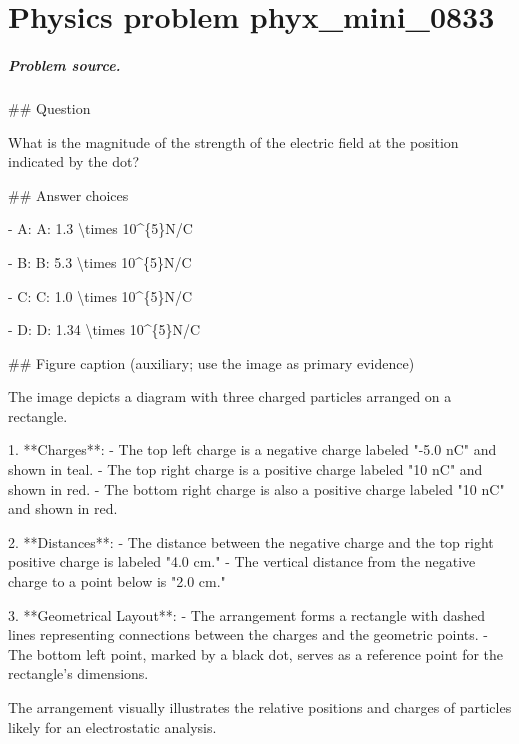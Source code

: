 
\chapter{Physics problem phyx\_mini\_0833}
\label{ch:PhyXMiniProblems_problem_phyx_mini_0833}

\paragraph{Problem source.}
\#\# Question

What is the magnitude of the strength of the electric field at the position indicated by the dot?

\#\# Answer choices

- A: A: 1.3 \textbackslash{}times 10\textasciicircum{}\{5\}N/C

- B: B: 5.3 \textbackslash{}times 10\textasciicircum{}\{5\}N/C

- C: C: 1.0 \textbackslash{}times 10\textasciicircum{}\{5\}N/C

- D: D: 1.34 \textbackslash{}times 10\textasciicircum{}\{5\}N/C

\#\# Figure caption (auxiliary; use the image as primary evidence)

The image depicts a diagram with three charged particles arranged on a rectangle. 

1. **Charges**:
   - The top left charge is a negative charge labeled "-5.0 nC" and shown in teal.
   - The top right charge is a positive charge labeled "10 nC" and shown in red.
   - The bottom right charge is also a positive charge labeled "10 nC" and shown in red.

2. **Distances**:
   - The distance between the negative charge and the top right positive charge is labeled "4.0 cm."
   - The vertical distance from the negative charge to a point below is "2.0 cm."

3. **Geometrical Layout**:
   - The arrangement forms a rectangle with dashed lines representing connections between the charges and the geometric points.
   - The bottom left point, marked by a black dot, serves as a reference point for the rectangle's dimensions.

The arrangement visually illustrates the relative positions and charges of particles likely for an electrostatic analysis.

